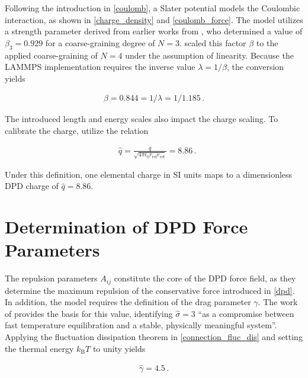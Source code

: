 \documentclass[
    11pt,
    a4paper,
    oneside,        %
    BCOR=10mm,      %
    parskip=half,   %
    listof=nototoc,   %
    bibliography=totoc %
]{scrreprt}
\begin{document}
Following the introduction in \cref{coulomb}, a Slater potential models the Coulombic interaction, as shown in \cref{charge_density} and \cref{coulomb_force}. The model utilizes a strength parameter derived from earlier works from \citeauthor{gonzales_electro} \cite{gonzales_electro}, who determined a value of $\beta_3 = 0.929$ for a coarse-graining degree of $N = 3$. \citeauthor{Wang2024} \cite{Wang2024} scaled this factor $\beta$ to the applied coarse-graining of $N = 4$ under the assumption of linearity. Because the LAMMPS implementation \cite{LAMMPS,LammpsSlater} requires the inverse value $\lambda = 1/\beta$, the conversion yields  

    
\begin{align}
    \beta = 0.844 = 1/\lambda = 1/1.185\, .
\end{align}
    
The introduced length and energy scales also impact the charge scaling. To calibrate the charge, \citeauthor{Wang2024} \cite{Wang2024,Allen2017_verlet} utilize the relation 

\begin{align}
    &\hat{q} = \frac{q}{\sqrt{4\pi \epsilon_0 r_{\text{ref}}e_{\text{ref}}}} = 8.86\, .
\end{align}

Under this definition, one elemental charge in SI units maps to a dimensionless DPD charge of $\hat{q} = 8.86$.

\section{Determination of DPD Force Parameters}\label{sec:dpd_parameters}

The repulsion parameters $A_{ij}$ constitute the core of the DPD force field, as they determine the maximum repulsion of the conservative force introduced in \cref{dpd}. In addition, the model requires the definition of the drag parameter $\gamma$. The work of \citeauthor{DPD_groot_warren} \cite{DPD_groot_warren} provides the basis for this value, identifying $\hat{\sigma} = 3$ \enquote{as a compromise between fast temperature equilibration and a stable, physically meaningful system}\cite{DPD_groot_warren}. Applying the fluctuation dissipation theorem in \cref{connection_fluc_dis} and 
setting the thermal energy $k_{\text{B}}T$ to unity yields
 
\begin{align}
    \hat{\gamma} = 4.5\, .
\end{align}
\end{document}
